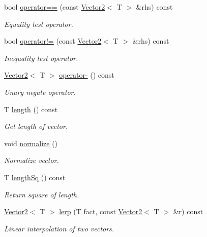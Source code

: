 \begin{DoxyCompactItemize}
bool \hyperlink{class_vector2_af44452c8cd74b57249f334fe3a0e5212}{operator==} (const \hyperlink{class_vector2}{Vector2}$<$ T $>$ \&rhs) const 
\begin{DoxyCompactList}\small\item\em Equality test operator. \item\end{DoxyCompactList}\item 
bool \hyperlink{class_vector2_a0c69e0a4ef5fdfdd5800525c7a751f08}{operator!=} (const \hyperlink{class_vector2}{Vector2}$<$ T $>$ \&rhs) const 
\begin{DoxyCompactList}\small\item\em Inequality test operator. \item\end{DoxyCompactList}\item 
\hyperlink{class_vector2}{Vector2}$<$ T $>$ \hyperlink{class_vector2_aa1367fe9fa837cd5dab8c9b57de5db6a}{operator-\/} () const 
\begin{DoxyCompactList}\small\item\em Unary negate operator. \item\end{DoxyCompactList}\item 
T \hyperlink{class_vector2_a119c51f16f90ffb3b30ee59475e7fdf8}{length} () const 
\begin{DoxyCompactList}\small\item\em Get length of vector. \item\end{DoxyCompactList}\item 
void \hyperlink{class_vector2_ace2a626eaa79412e2946216e9c3e63c6}{normalize} ()
\begin{DoxyCompactList}\small\item\em Normalize vector. \item\end{DoxyCompactList}\item 
T \hyperlink{class_vector2_a54aeb0e64f05cb4eb6787b6ac9f9a468}{lengthSq} () const 
\begin{DoxyCompactList}\small\item\em Return square of length. \item\end{DoxyCompactList}\item 
\hyperlink{class_vector2}{Vector2}$<$ T $>$ \hyperlink{class_vector2_a1377e154f9f49724dbf28e2d6f43fe66}{lerp} (T fact, const \hyperlink{class_vector2}{Vector2}$<$ T $>$ \&r) const 
\begin{DoxyCompactList}\small\item\em Linear interpolation of two vectors. \item\end{DoxyCompactList}\item 

\end{DoxyCompactItemize}
